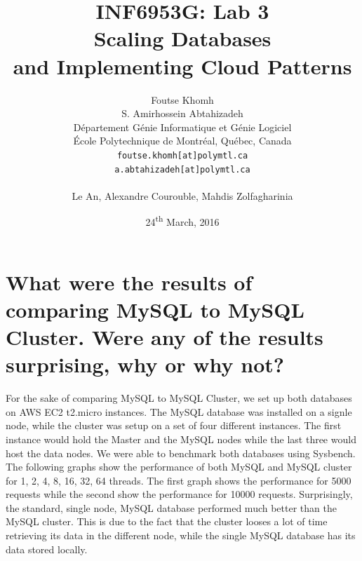 \documentclass{article}
\title{INF6953G: Lab 3 \\Scaling Databases \\and Implementing Cloud Patterns}
\author{
    Foutse Khomh \\
    S. Amirhossein Abtahizadeh \\
    D\'{e}partement G\'{e}nie Informatique et G\'{e}nie Logiciel \\
    \'{E}cole Polytechnique de Montr\'{e}al, Qu\'{e}bec, Canada \\
    \texttt{foutse.khomh[at]polymtl.ca} \\
    \texttt{a.abtahizadeh[at]polymtl.ca}\\
    {} \\
    Le An, Alexandre Courouble, Mahdis Zolfagharinia
}
\date{24\textsuperscript{th} March, 2016}
\begin{document}
\maketitle



\section{What were the results of comparing MySQL to MySQL Cluster. Were any of the results surprising, why or why not?}\label{Q1}

For the sake of comparing MySQL to MySQL Cluster, we set up both databases on AWS EC2 t2.micro instances. The MySQL database was installed on a signle node, while the cluster was setup on a set of four different instances. The first instance would hold the Master and the MySQL nodes while the last three would host the data nodes. We were able to benchmark both databases using Sysbench. The following graphs show the performance of both MySQL and MySQL cluster for 1, 2, 4, 8, 16, 32, 64 threads. The first graph shows the performance for 5000 requests while the second show the performance for 10000 requests. Surprisingly, the standard, single node, MySQL database performed much better than the MySQL cluster. This is due to the fact that the cluster looses a lot of time retrieving its data in the different node, while the single MySQL database has its data stored locally. 
\end{document}
